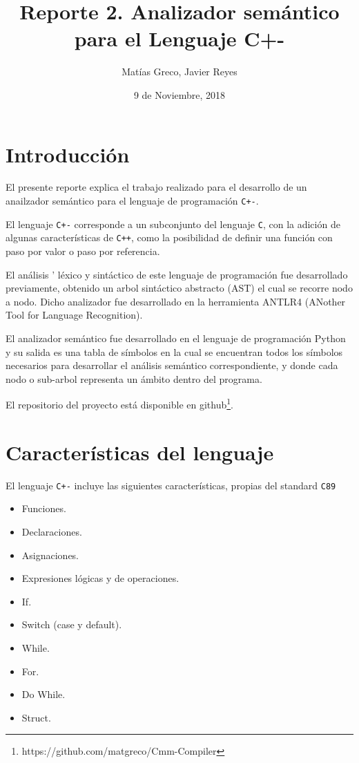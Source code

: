 \documentclass[12pt]{article}
\newcommand{\Cp}{\texttt{C+-}}
\newcommand{\C}{\texttt{C}}
\newcommand{\Cpp}{\texttt{C++}}
\begin{document}

\title{Reporte 2. Analizador semántico para el Lenguaje C+-}
\author{Mat\'ias Greco, Javier Reyes}
\date{9 de Noviembre, 2018}
\maketitle

\section*{Introducci\'on}
El presente reporte explica el trabajo realizado para el desarrollo de un anailzador sem\'antico para el lenguaje de programaci\'on \Cp.

El lenguaje \texttt{C+-} corresponde a un subconjunto del lenguaje \C, con la adici\'on de algunas caracter\'isticas de \Cpp, como la posibilidad de definir una funci\'on con paso por valor o paso por referencia.

El an\'alisis  ' l\'exico y sint\'actico de este lenguaje de programación fue desarrollado previamente, obtenido un arbol sintáctico abstracto (AST) el cual se recorre nodo a nodo. Dicho analizador fue desarrollado en la herramienta ANTLR4 (ANother Tool for Language Recognition). 

El analizador sem\'antico fue desarrollado en el lenguaje de programación Python y su salida es una tabla de s\'imbolos en la cual se encuentran todos los s\'imbolos necesarios para desarrollar el an\'alisis sem\'antico correspondiente, y donde cada nodo o sub-arbol representa un \'ambito dentro del programa.

El repositorio del proyecto está disponible en github\footnote{https://github.com/matgreco/Cmm-Compiler}.


\section*{Caracter\'isticas del lenguaje}

El lenguaje \texttt{C+-} incluye las siguientes caracter\'isticas, propias del standard \texttt{C89}
\begin{itemize}
    \item Funciones.
    \item Declaraciones.
    \item Asignaciones.
    \item Expresiones l\'ogicas y de operaciones.
    \item If.
    \item Switch (case y default).
    \item While.
    \item For.
    \item Do While.
    \item Struct.
\end{itemize}
\end{document}
